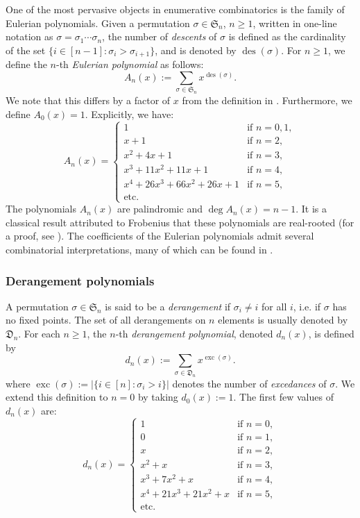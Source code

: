 \documentclass[11pt, a4paper, english]{amsart}
\theoremstyle{teoremas}
\theoremstyle{definition}
\newcommand{\des}{\operatorname{des}}
\begin{document}
One of the most pervasive objects in enumerative combinatorics is the family of  Eulerian polynomials. Given a permutation $\sigma\in\mathfrak{S}_n$, $n\geq 1$, written in one-line notation as $\sigma=\sigma_1\cdots\sigma_n$, the number of \emph{descents} of $\sigma$ is defined as the cardinality of the set $\{i\in [n-1]:\sigma_i>\sigma_{i+1}\}$, and is denoted by $\des(\sigma)$. For $n\geq 1$, we define the $n$-th \emph{Eulerian polynomial} as follows:
    \[ A_n(x) := \sum_{\sigma\in\mathfrak{S}_n} x^{\des(\sigma)}.\] 
We note that this differs by a factor of $x$ from the definition in \cite[p.~33]{stanley-ec1}. Furthermore, we define $A_0(x)=1$. Explicitly, we have:
    \[ A_n(x) = \begin{cases}
        1 & \text{if } n = 0,1,\\
        x+1 & \text{if } n = 2,\\
        x^2+4x+1 & \text{if } n=3,\\
        x^3+11x^2+11x+1 & \text{if } n=4,\\
        x^4+26x^3+66x^2+26x+1 & \text{if } n=5,\\
        \text{etc.} &
    \end{cases}\]
The polynomials $A_n(x)$ are palindromic and $\deg A_n(x) = n-1$. It is a classical result attributed to Frobenius that these polynomials are real-rooted (for a proof, see \cite[Example 7.3]{branden}). The coefficients of the Eulerian polynomials admit several combinatorial interpretations, many of which can be found in \cite[Chapter 1]{stanley-ec1}.

\subsubsection{Derangement polynomials}

A permutation $\sigma\in\mathfrak{S}_n$ is said to be a \emph{derangement} if $\sigma_i\neq i$ for all $i$, i.e. if $\sigma$ has no fixed points. The set of all derangements on $n$ elements is usually denoted by $\mathfrak{D}_n$. For each $n\geq 1$, the $n$-th \emph{derangement polynomial}, denoted $d_n(x)$, is defined by
    \[ d_n(x) := \sum_{\sigma\in\mathfrak{D}_n} x^{\operatorname{exc}(\sigma)}.\]
where $\operatorname{exc}(\sigma):=|\{i\in [n]:\sigma_i>i\}|$ denotes the number of \emph{excedances} of $\sigma$. We extend this definition to $n=0$ by taking $d_0(x):=1$. The first few values of $d_n(x)$ are:
    \[ d_n(x) = \begin{cases}
        1 & \text{if } n = 0,\\
        0 & \text{if } n = 1,\\
        x & \text{if } n = 2,\\
        x^2+x& \text{if } n=3,\\
        x^3+7x^2+x & \text{if } n=4,\\
        x^4+21x^3+21x^2+x & \text{if } n=5,\\
        \text{etc.} &
    \end{cases}\]
\end{document}
